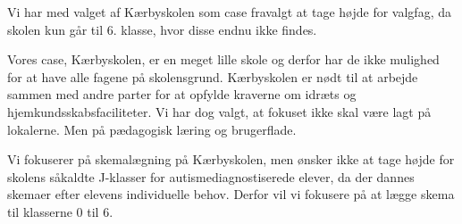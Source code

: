Vi har med valget af Kærbyskolen som case fravalgt at tage højde for valgfag, da skolen kun går til 6. klasse, hvor disse endnu ikke findes. 

Vores case, Kærbyskolen, er en meget lille skole og derfor  har de ikke mulighed for at have alle fagene på skolensgrund. Kærbyskolen er nødt til at arbejde sammen med andre parter for at opfylde kraverne om idræts og hjemkundsskabsfaciliteter. Vi har dog valgt, at fokuset ikke skal være lagt på lokalerne. Men på pædagogisk læring og brugerflade.

Vi fokuserer på skemalægning på Kærbyskolen, men ønsker ikke at tage højde for skolens såkaldte J-klasser for autismediagnostiserede elever, da der dannes skemaer efter elevens individuelle behov. Derfor vil vi fokusere på at lægge skema til klasserne 0 til 6.



